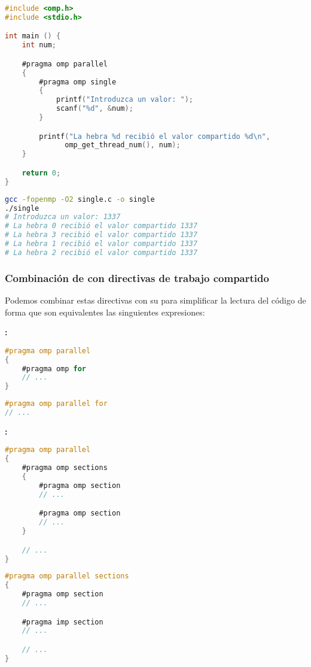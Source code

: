 \pagebreak

\begin{lstlisting}[language=C]
#include <omp.h>
#include <stdio.h>

int main () {
	int num;

	#pragma omp parallel
	{
		#pragma omp single
		{
			printf("Introduzca un valor: ");
			scanf("%d", &num);
		}

		printf("La hebra %d recibió el valor compartido %d\n",
	          omp_get_thread_num(), num);
	}

	return 0;
}
\end{lstlisting}

\begin{lstlisting}[language=sh]
gcc -fopenmp -O2 single.c -o single
./single
# Introduzca un valor: 1337
# La hebra 0 recibió el valor compartido 1337
# La hebra 3 recibió el valor compartido 1337
# La hebra 1 recibió el valor compartido 1337
# La hebra 2 recibió el valor compartido 1337
\end{lstlisting}

\subsubsection{Combinación de  con directivas de trabajo compartido}

Podemos combinar estas directivas con su  para simplificar la lectura del código de forma que son equivalentes las singuientes expresiones:

\textbf{:}

\begin{lstlisting}[language=C]
#pragma omp parallel
{
	#pragma omp for
	// ...
}
\end{lstlisting}

\begin{lstlisting}[language=C]
#pragma omp parallel for
// ...
\end{lstlisting}

\textbf{:}

\begin{lstlisting}[language=C]
#pragma omp parallel
{
	#pragma omp sections
	{
		#pragma omp section
		// ...

		#pragma omp section
		// ...
	}

	// ...
}
\end{lstlisting}

\begin{lstlisting}[language=C]
#pragma omp parallel sections
{
	#pragma omp section
	// ...

	#pragma imp section
	// ...

	// ...
}
\end{lstlisting}

